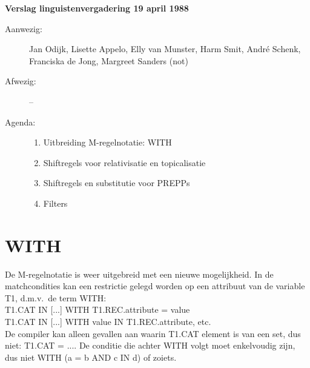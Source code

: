

   \RosDate{\today}
   \RosSupersedes{-}
   \MakeRosTitle
%
%

\noindent
{\bf Verslag linguistenvergadering 19 april 1988}
\begin{description}
\item[Aanwezig:] Jan Odijk, Lisette Appelo, Elly van Munster, Harm Smit, 
Andr\'{e} Schenk, Franciska de Jong, Margreet Sanders (not)
\item[Afwezig:] --
\item[Agenda:] \mbox{}
\begin{enumerate}
\item Uitbreiding M-regelnotatie: WITH
\item Shiftregels voor relativisatie en topicalisatie
\item Shiftregels en substitutie voor PREPPs
\item Filters
\end{enumerate}
\end{description}

\section{WITH}
De M-regelnotatie is weer uitgebreid met een nieuwe mogelijkheid. In de 
matchcondities kan een restrictie gelegd worden op een attribuut van de
variable T1, d.m.v.\ de term WITH:\\
T1.CAT IN [...] WITH T1.REC.attribute = value\\
T1.CAT IN [...] WITH value IN T1.REC.attribute, etc.\\
De compiler kan alleen gevallen aan waarin T1.CAT element is van een set, 
dus niet: T1.CAT = .... De conditie die achter WITH volgt moet enkelvoudig 
zijn, dus niet WITH (a = b AND c IN d) of zoiets.

